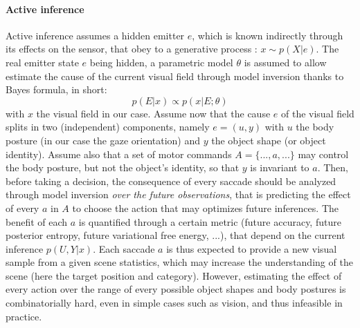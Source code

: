 \paragraph{Active inference}
Active inference assumes a hidden emitter $e$, which is known indirectly through its effects on the sensor, that obey to a generative process : $x\sim p(X|e)$. The real emitter state $e$ being hidden, a parametric model $\theta$ is assumed to allow estimate the cause of the current visual field through model inversion thanks to Bayes formula, in short:
$$p(E|x) \propto p(x|E;\theta)$$
with $x$ the visual field in our case. Assume now that the cause $e$ of the visual field splits in two (independent) components, namely $e = (u,y)$ with $u$ the body posture (in our case the gaze orientation) and $y$ the object shape (or object identity). Assume also that a set of motor commands $A = \{..., a, ...\}$ may control the body posture, but not the object's identity, so that $y$ is invariant to $a$.
Then, before taking a decision, the consequence of every saccade should be analyzed through model inversion \emph{over the future observations}, that is predicting the effect of every $a$ in $A$ to choose the action that may optimizes future inferences. The benefit of each $a$ is quantified through a certain metric (future accuracy, future posterior entropy, future variational free energy, ...), that depend on the current inference $p(U,Y|x)$. Each saccade $a$ is thus expected to provide a new visual sample from a given scene statistics, which may increase the understanding of the scene (here the target position and category). However, estimating the effect of every action over the range of every possible object shapes and body postures is combinatorially hard, even in simple cases such as vision, and thus infeasible in practice.


